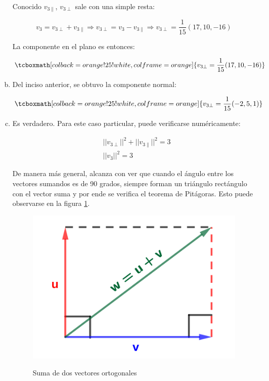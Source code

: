 \documentclass{article}
\begin{document}
\begin{enumerate}[(a)]
Conocido $v_{3\parallel}$, $v_{3\perp}$ sale con una simple resta:

\begin{equation}
v_3 = v_{3\perp} + v_{3\parallel} \Rightarrow v_{3\perp} = v_3 - v_{3\parallel} \Rightarrow v_{3\perp} = \frac{1}{15} (17, 10, -16)
\end{equation}

La componente en el plano es entonces:

\begin{equation}
\tcboxmath[colback=orange!25!white,colframe=orange]
{ v_{3\perp} = \frac{1}{15} (17, 10, -16) }
\end{equation}

\item Del inciso anterior, se obtuvo la componente normal:

\begin{equation}
\tcboxmath[colback=orange!25!white,colframe=orange]
{ v_{3\perp} = \frac{1}{15} (-2, 5, 1) }
\end{equation}

\item Es verdadero. Para este caso particular, puede verificarse numéricamente:

\begin{subequations}
\begin{align}
& ||v_{3\perp}||^2 + ||v_{3\parallel}||^2 = 3 \\
& ||v_3||^2 = 3
\end{align}
\end{subequations}

De manera más general, alcanza con ver que cuando el ángulo entre los vectores sumandos es de 90 grados, siempre forman un triángulo rectángulo con el vector suma y por ende se verifica el teorema de Pitágoras. Esto puede observarse en la figura \ref{fig:1-9-c}.

\begin{figure}[ht]
\caption{Suma de dos vectores ortogonales}
\includegraphics[scale=1]{img/ejercicios/1/9-c.png} 
\centering
\label{fig:1-9-c}
\end{figure}


\end{enumerate}
\end{document}
